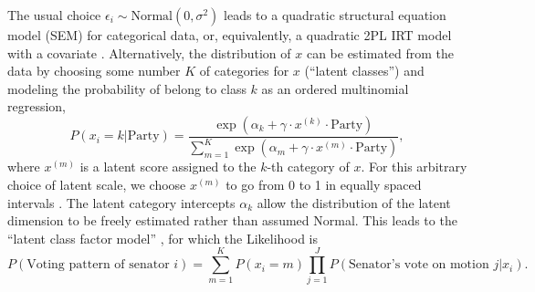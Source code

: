 \documentclass[12pt]{article}
\begin{document}
The usual choice $\epsilon_i \sim \text{Normal}(0, \sigma^2)$  leads to a quadratic structural equation model (SEM) for categorical data, or, equivalently, a quadratic 2PL IRT model with a covariate \citep{rabe2004generalized}. Alternatively, the distribution of $x$ can be estimated from the data by choosing some number $K$ of categories for $x$ (``latent classes'') and modeling the probability of belong to class $k$ as an ordered multinomial regression,
\begin{equation}
	P(x_i = k | \text{Party}) = \frac{\exp(\alpha_k + \gamma \cdot x^{(k)} \cdot \text{Party})}
		{\sum^{K}_{m=1} \exp(\alpha_m + \gamma \cdot x^{(m)} \cdot \text{Party})},
\end{equation}
where $x^{(m)}$ is a latent score assigned to the $k$-th category of $x$. For this arbitrary choice of latent scale, we choose $x^{(m)}$ to go from 0 to 1 in equally spaced intervals \citep[following][]{vermunt2013technical}. The latent category intercepts $\alpha_k$ allow the distribution of the latent dimension to be freely estimated rather than assumed Normal. This leads to the ``latent class factor model'' \citep{vermunt_factor_2004}, for which the Likelihood is 
\begin{equation}
	P(\text{Voting pattern of senator } i) = \sum^{K}_{m=1} P(x_i = m) 
	\prod^{J}_{j=1} P(\text{Senator's vote on motion } j| x_i).
\end{equation}


\end{document}
